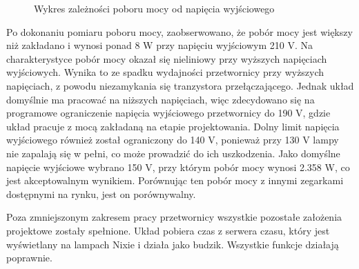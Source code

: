 \documentclass[../main.tex]{subfiles}
\begin{document}
\begin{figure}[H]
  \centering
  \caption{Wykres zależności poboru mocy od napięcia wyjściowego}
  \label{fig:power}
\end{figure}

Po dokonaniu pomiaru poboru mocy, zaobserwowano, że pobór mocy jest większy niż zakładano i wynosi ponad 8 W przy napięciu wyjściowym 210 V.
Na charakterystyce pobór mocy okazał się nieliniowy przy wyższych napięciach wyjściowych. Wynika to ze spadku wydajności przetwornicy przy wyższych napięciach,
z powodu niezamykania się tranzystora przełączającego. Jednak układ domyślnie ma pracować na niższych napięciach, więc 
zdecydowano się na programowe ograniczenie napięcia wyjściowego przetwornicy do 190 V, gdzie układ pracuje z mocą zakładaną na etapie projektowania. Dolny limit napięcia wyjściowego również
został ograniczony do 140 V, ponieważ przy 130 V lampy nie zapalają się w pełni, co może prowadzić do ich uszkodzenia. 
Jako domyślne napięcie wyjściowe wybrano 150 V, przy którym pobór mocy wynosi 2.358 W, co jest akceptowalnym wynikiem.
Porównując ten pobór mocy z innymi zegarkami dostępnymi na rynku, jest on porównywalny.

Poza zmniejszonym zakresem pracy przetwornicy wszystkie pozostałe założenia projektowe zostały spełnione. Układ 
pobiera czas z serwera czasu, który jest wyświetlany na lampach Nixie i działa jako budzik. Wszystkie funkcje działają poprawnie.
\end{document}
